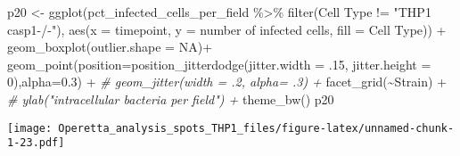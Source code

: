 \documentclass[
]{article}
\newenvironment{Shaded}{\begin{snugshade}}{\end{snugshade}}
\newcommand{\AttributeTok}[1]{\textcolor[rgb]{0.77,0.63,0.00}{#1}}
\newcommand{\CommentTok}[1]{\textcolor[rgb]{0.56,0.35,0.01}{\textit{#1}}}
\newcommand{\ConstantTok}[1]{\textcolor[rgb]{0.00,0.00,0.00}{#1}}
\newcommand{\DecValTok}[1]{\textcolor[rgb]{0.00,0.00,0.81}{#1}}
\newcommand{\FloatTok}[1]{\textcolor[rgb]{0.00,0.00,0.81}{#1}}
\newcommand{\FunctionTok}[1]{\textcolor[rgb]{0.00,0.00,0.00}{#1}}
\newcommand{\NormalTok}[1]{#1}
\newcommand{\OtherTok}[1]{\textcolor[rgb]{0.56,0.35,0.01}{#1}}
\newcommand{\SpecialCharTok}[1]{\textcolor[rgb]{0.00,0.00,0.00}{#1}}
\newcommand{\StringTok}[1]{\textcolor[rgb]{0.31,0.60,0.02}{#1}}
\begin{document}
\begin{Shaded}
\begin{Highlighting}[]
\NormalTok{p20 }\OtherTok{\textless{}{-}} \FunctionTok{ggplot}\NormalTok{(pct\_infected\_cells\_per\_field }\SpecialCharTok{\%\textgreater{}\%}
                \FunctionTok{filter}\NormalTok{(}\StringTok{\textasciigrave{}}\AttributeTok{Cell Type}\StringTok{\textasciigrave{}} \SpecialCharTok{!=} \StringTok{"THP1 casp1{-}/{-}"}\NormalTok{), }\FunctionTok{aes}\NormalTok{(}\AttributeTok{x =}\NormalTok{ timepoint, }\AttributeTok{y =} \StringTok{\textasciigrave{}}\AttributeTok{number of infected cells}\StringTok{\textasciigrave{}}\NormalTok{, }\AttributeTok{fill =} \StringTok{\textasciigrave{}}\AttributeTok{Cell Type}\StringTok{\textasciigrave{}}\NormalTok{)) }\SpecialCharTok{+}
  \FunctionTok{geom\_boxplot}\NormalTok{(}\AttributeTok{outlier.shape =} \ConstantTok{NA}\NormalTok{)}\SpecialCharTok{+}
  \FunctionTok{geom\_point}\NormalTok{(}\AttributeTok{position=}\FunctionTok{position\_jitterdodge}\NormalTok{(}\AttributeTok{jitter.width =}\NormalTok{ .}\DecValTok{15}\NormalTok{, }\AttributeTok{jitter.height =} \DecValTok{0}\NormalTok{),}\AttributeTok{alpha=}\FloatTok{0.3}\NormalTok{) }\SpecialCharTok{+}
  \CommentTok{\#  geom\_jitter(width = .2, alpha= .3) +}
  \FunctionTok{facet\_grid}\NormalTok{(}\SpecialCharTok{\textasciitilde{}}\NormalTok{Strain) }\SpecialCharTok{+}
  \CommentTok{\#  ylab("intracellular bacteria per field") +}
  \FunctionTok{theme\_bw}\NormalTok{()}
\NormalTok{p20}
\end{Highlighting}
\end{Shaded}

\texttt{[image: Operetta\_analysis\_spots\_THP1\_files/figure-latex/unnamed-chunk-1-23.pdf]}
\end{document}
